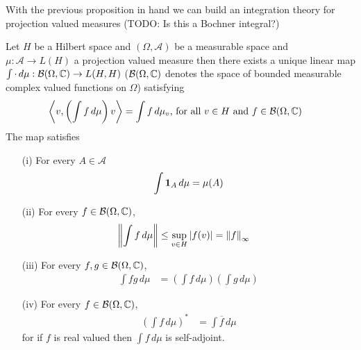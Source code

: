 With the previous proposition in hand we can build an integration theory for projection valued measures (TODO: Is this a Bochner integral?)
\begin{prop}\label{hilbert:OperatorValuedIntegration}Let $H$ be a Hilbert space and $(\Omega, \mathcal{A})$ be a measurable space and $\mu : \mathcal{A} \to L(H)$ a projection valued measure then there exists a unique linear map $\int \cdot \, d\mu : \mathcal{B}(\Omega, \mathbb{C}) \to L(H,H)$ ($\mathcal{B}(\Omega, \mathbb{C})$ denotes the space of bounded measurable complex valued functions on $\Omega$) satisfying
\begin{align}\label{hilbert:DefiningPropertyOfOperatorIntegral}
\left \langle v, \left(\int f \, d\mu \right) v \right \rangle &= \int f \, d\mu_v \text{, for all $v \in H$ and $f \in \mathcal{B}(\Omega, \mathbb{C})$}
\end{align}
The map satisfies
\begin{itemize}
\item[(i)] For every $A \in \mathcal{A}$ 
\begin{align*}
\int \textbf{1}_{A} \, d\mu = \mu(A)
\end{align*}
\item[(ii)] For every $f \in \mathcal{B}(\Omega, \mathbb{C})$, 
\begin{align*}
\left \lVert \int f \, d\mu \right \rVert &\leq \sup_{v \in H} \left \vert f(v) \right \vert = \left \lVert f \right \rVert_\infty
\end{align*}
\item[(iii)] For every $f,g  \in \mathcal{B}(\Omega, \mathbb{C})$, 
\begin{align*}
\int f g \, d\mu &= \left ( \int f \, d\mu \right ) \left ( \int g \, d\mu \right )
\end{align*}
\item[(iv)] For every $f \in \mathcal{B}(\Omega, \mathbb{C})$, 
\begin{align*}
\left( \int f \, d\mu \right)^*  &= \int \overline{f} \, d\mu 
\end{align*}
for if $f$ is real valued then $\int f \, d\mu$ is self-adjoint.
\end{itemize}
\end{prop}
